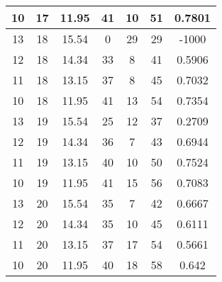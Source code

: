 \documentclass[letterpaper, 12pt]{article}
\begin{document}
\begin{longtable}{|c|c|c|c|c|c|c|}
10 & 17 & 11.95 & 41 & 10 & 51 & 0.7801 \\
\hline
13 & 18 & 15.54 & 0 & 29 & 29 & -1000 \\
\hline
12 & 18 & 14.34 & 33 & 8 & 41 & 0.5906 \\
\hline
11 & 18 & 13.15 & 37 & 8 & 45 & 0.7032 \\
\hline
10 & 18 & 11.95 & 41 & 13 & 54 & 0.7354 \\
\hline
13 & 19 & 15.54 & 25 & 12 & 37 & 0.2709 \\
\hline
12 & 19 & 14.34 & 36 & 7 & 43 & 0.6944 \\
\hline
11 & 19 & 13.15 & 40 & 10 & 50 & 0.7524 \\
\hline
10 & 19 & 11.95 & 41 & 15 & 56 & 0.7083 \\
\hline
13 & 20 & 15.54 & 35 & 7 & 42 & 0.6667 \\
\hline
12 & 20 & 14.34 & 35 & 10 & 45 & 0.6111 \\
\hline
11 & 20 & 13.15 & 37 & 17 & 54 & 0.5661 \\
\hline
10 & 20 & 11.95 & 40 & 18 & 58 & 0.642 \\
\hline
\end{longtable}
\end{document}
